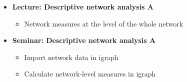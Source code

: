 \documentclass[8pt]{beamer}
\begin{document}
\bgroup
{}
\begin{frame}[plain]{}
\begin{center}
\color{white}{\Huge\insertsection}
\end{center}
\end{frame}
\egroup


\begin{frame}
\frametitle{\insertsection}

\begin{itemize}
\item 	\textbf{Lecture: Descriptive network analysis A}
	\begin{itemize}
	\item Network measures at the level of the whole network
	\end{itemize}		
	
\medskip
\medskip

\item 	\textbf{Seminar: Descriptive network analysis A}
	\begin{itemize}
	\item Import network data in igraph
	\item Calculate network-level measures in igraph
	\end{itemize}	
		
\end{itemize}

\end{frame}

\end{document}
